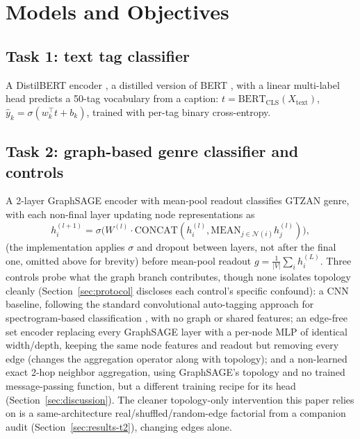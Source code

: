 \section{Models and Objectives}\label{sec:models}

\subsection{Task 1: text tag classifier}
A DistilBERT encoder \cite{sanh2019distilbert}, a distilled version of BERT
\cite{devlin2019bert}, with a linear multi-label head predicts a 50-tag vocabulary from a
caption:
$t = \mathrm{BERT}_{\mathrm{CLS}}(X_{\mathrm{text}})$, $\hat{y}_k = \sigma(w_k^\top t + b_k)$,
trained with per-tag binary cross-entropy.

\subsection{Task 2: graph-based genre classifier and controls}
A 2-layer GraphSAGE encoder \cite{hamilton2017graphsage} with mean-pool readout classifies
GTZAN \cite{tzanetakis2002gtzan} genre, with each
non-final layer updating node representations as
\[
h_i^{(l+1)} = \sigma\big(W^{(l)} \cdot \mathrm{CONCAT}(h_i^{(l)}, \mathrm{MEAN}_{j\in\mathcal{N}(i)}h_j^{(l)})\big),
\]
(the implementation applies $\sigma$ and dropout between layers, not after the final one,
omitted above for brevity) before mean-pool readout $g = \tfrac{1}{|V|}\sum_i h_i^{(L)}$.
Three controls probe what the graph branch contributes, though none isolates topology
cleanly (Section~\ref{sec:protocol} discloses each control's specific confound): a CNN
baseline, following the standard convolutional auto-tagging approach for spectrogram-based
classification \cite{choi2016autotagging,won2020evaluation}, with no graph or shared
features; an edge-free set encoder replacing every GraphSAGE layer with a per-node MLP of
identical width/depth, keeping the same node features and readout but removing every edge
(changes the aggregation operator along with topology); and a non-learned exact 2-hop
neighbor aggregation, using GraphSAGE's topology and no trained message-passing function, but
a different training recipe for its head (Section~\ref{sec:discussion}). The cleaner
topology-only intervention this paper relies on is a same-architecture
real/shuffled/random-edge factorial from a companion audit \cite{tismir_audit}
(Section~\ref{sec:results-t2}), changing edges alone.

